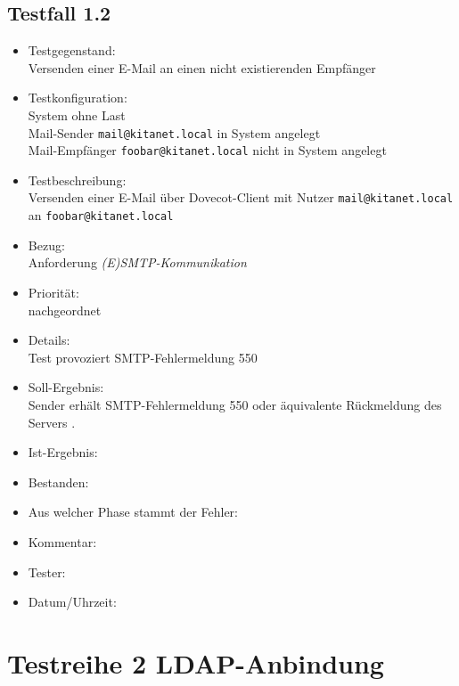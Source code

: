 \subsection{Testfall 1.2}
\begin{itemize}
	\item Testgegenstand:\\
	Versenden einer E-Mail an einen nicht existierenden Empfänger
	\item Testkonfiguration:\\
	System ohne Last\\
	Mail-Sender \verb+mail@kitanet.local+ in System angelegt\\
	Mail-Empfänger \verb+foobar@kitanet.local+ nicht in System angelegt
	\item Testbeschreibung:\\
	Versenden einer E-Mail über Dovecot-Client mit Nutzer \verb+mail@kitanet.local+ \\ an \verb+foobar@kitanet.local+
	\item Bezug:\\
	Anforderung \textit{(E)SMTP-Kommunikation}
	\item Priorität:\\
	nachgeordnet
	\item Details:\\
	Test provoziert SMTP-Fehlermeldung 550
	\item Soll-Ergebnis:\\
	Sender erhält SMTP-Fehlermeldung 550 oder äquivalente Rückmeldung des Servers \citep[vgl.][16]{rfc821}.
	\item Ist-Ergebnis:\\
	\item Bestanden:\\
	\item Aus welcher Phase stammt der Fehler:\\
	\item Kommentar:\\
	\item Tester:\\
	\item Datum/Uhrzeit:\\
\end{itemize}

\section{Testreihe 2 LDAP-Anbindung}
